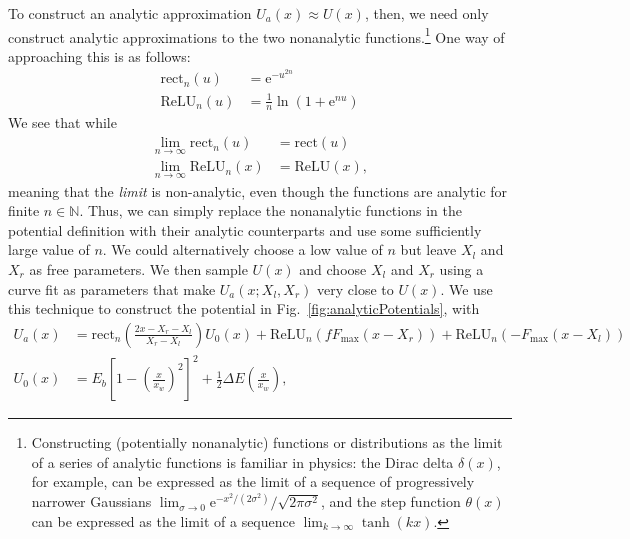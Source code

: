 \documentclass[hyperref={colorlinks=true, urlcolor=blue, citecolor=blue, final, bound}]{sfuthesis}
\newcommand{\e}{\mathrm{e}}
\begin{document}
To construct an analytic approximation $U_a(x)\approx U(x)$, then, we need only construct analytic approximations to the two nonanalytic functions.\footnote{Constructing (potentially nonanalytic) functions or distributions as the limit of a series of analytic functions is familiar in physics: the Dirac delta $\delta(x)$, for example, can be expressed as the limit of a sequence of progressively narrower Gaussians $\lim_{\sigma\rightarrow 0}\e^{-x^2/(2\sigma^2)}/\sqrt{2\pi\sigma^2}$, and the step function $\theta(x)$ can be expressed as the limit of a sequence $\lim_{k\rightarrow\infty}\tanh(kx)$.} One way of approaching this is as follows:
\begin{align}
    \mathrm{rect}_n(u) &= \e^{-u^{2n}}\\
    \mathrm{ReLU}_n(u) &= \frac 1n\ln(1+\e^{nu})
\end{align}
We see that while
\begin{align}
    \lim_{n\rightarrow\infty}\mathrm{rect}_n(u) &= \mathrm{rect}(u)\\
    \lim_{n\rightarrow\infty}\mathrm{ReLU}_n(x) &= \mathrm{ReLU}(x),
\end{align}
meaning that the \textit{limit} is non-analytic, even though the functions are analytic for finite $n\in\mathbb N$. Thus, we can simply replace the nonanalytic functions in the potential definition with their analytic counterparts and use some sufficiently large value of $n$. We could alternatively choose a low value of $n$ but leave $X_l$ and $X_r$ as free parameters. We then sample $U(x)$ and choose $X_l$ and $X_r$ using a curve fit as parameters that make $U_a(x; X_l, X_r)$ very close to $U(x)$. We use this technique to construct the potential in Fig.~\ref{fig:analyticPotentials}, with
\begin{align}
    U_a(x) &= \mathrm{rect}_n\left( \frac{2x-X_r-X_l}{X_r-X_l} \right)U_0(x)+\mathrm{ReLU}_n(fF_{\max}(x-X_r))+\mathrm{ReLU}_n(-F_{\max}(x-X_l))\label{eq:analyticPotential}\\
    U_0(x) &= E_b\left[ 1-\left(\frac x{x_w}\right)^2 \right]^2 + \frac 12 \Delta E\left(\frac x{x_w}\right),
\end{align}
\end{document}
